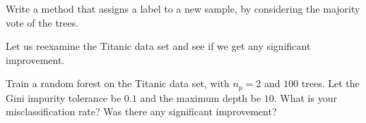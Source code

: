 \begin{problem}
Write a method that assigns a label to a new sample, by considering the majority vote of the trees.
\end{problem}

Let us reexamine the Titanic data set and see if we get any significant improvement.

\begin{problem}
Train a random forest on the Titanic data set, with $n_{p} = 2$ and $100$ trees. Let the Gini impurity tolerance be $0.1$ and the maximum depth be $10$. What is your misclassification rate? Was there any significant improvement?
\end{problem}
